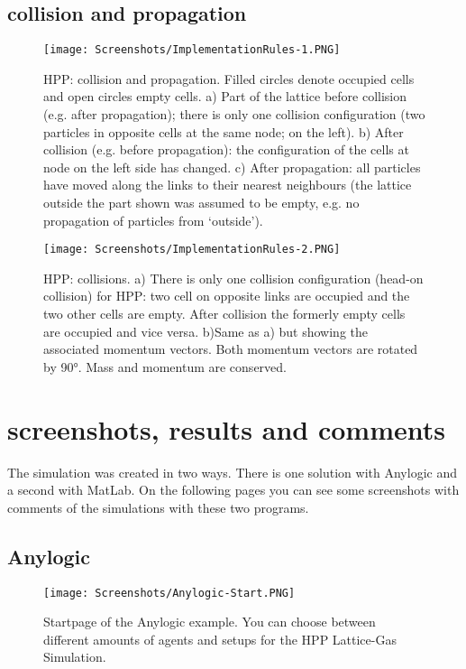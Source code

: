\documentclass[paper=a4, fontsize=11pt]{scrartcl} %
\numberwithin{equation}{section} %
\numberwithin{figure}{section} %
\numberwithin{table}{section} %
\begin{document}
\pagebreak
\subsection{collision and propagation}

\begin{figure}[!htp]
	\centering
		\texttt{[image: Screenshots/ImplementationRules-1.PNG]}
	\caption[HPP collisions and propagation]{HPP: collision and propagation. Filled circles denote occupied cells and
open circles empty cells. 
a) Part of the lattice before collision (e.g. after propagation);
there is only one collision configuration (two particles in opposite cells at the same node; on the left). 
b) After collision (e.g. before propagation): the configuration of the cells at node on the left side has changed. 
c) After propagation: all particles have moved along the links to their nearest neighbours (the lattice outside the part shown was assumed to be empty, e.g. no propagation of particles from `outside'). \cite{LGCA}} 
	\label{fig:collision_propagation}
\end{figure}

\begin{figure}[!htp]
	\centering
		\texttt{[image: Screenshots/ImplementationRules-2.PNG]}
	\caption[HPP collisions]{HPP: collisions. 
a) There is only one collision configuration (head-on collision) for HPP: two cell on opposite links are occupied and the two other cells are empty. After collision the formerly empty cells are occupied and vice versa. 
b)Same as a) but showing the associated momentum vectors. Both momentum vectors are rotated by 90°. Mass and momentum are conserved. \cite{LGCA} }
	\label{fig:collisions}
\end{figure}

\pagebreak
\section{screenshots, results and comments}
The simulation was created in two ways. There is one solution with Anylogic and a second with MatLab. On the following pages you can see some screenshots with comments of the simulations with these two programs.

\subsection{Anylogic}

\begin{figure}[!htp]
	\centering
		\texttt{[image: Screenshots/Anylogic-Start.PNG]}
	\caption[Anylogic Startpage]{Startpage of the Anylogic example. You can choose between different amounts of agents and setups for the HPP Lattice-Gas Simulation.}
	\label{fig:anylogic-start}
\end{figure}
\end{document}
